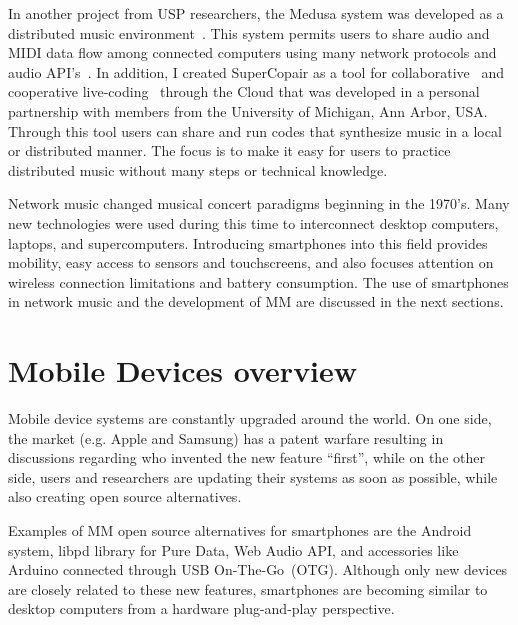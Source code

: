 In another project from USP researchers, the Medusa system was developed as a distributed music environment~\citep{Schiavoni2011medusa,Schiavoni2012network,Schiavoni2013network}.
This system permits users to share audio and MIDI data flow among connected computers using many network protocols and audio API's~\citep{Schiavoni2013thesis}.
In addition, I created SuperCopair as a tool for collaborative~\citep{deCarvalhoJunior2015supercopair} and cooperative live-coding~\citep{deCarvalhoJunior2015cooperative} through the Cloud that was developed in a personal partnership with members from the University of Michigan, Ann Arbor, USA.
Through this tool users can share and run codes that synthesize music in a local or distributed manner.
The focus is to make it easy for users to practice distributed music without many steps or technical knowledge.

Network music changed musical concert paradigms beginning in the 1970's.
Many new technologies were used during this time to interconnect desktop computers, laptops, and supercomputers.
Introducing smartphones into this field provides mobility, easy access to sensors and touchscreens, and also focuses attention on wireless connection limitations and battery consumption.
The use of smartphones in network music and the development of MM are discussed in the next sections.

\section{Mobile Devices overview}
\label{sec:mobiletechnologies}

Mobile device systems are constantly upgraded around the world.
On one side, the market (e.g. Apple and Samsung) has a patent warfare resulting in discussions regarding who invented the new feature ``first'', while on the other side, users and researchers are updating their systems as soon as possible, while also creating open source alternatives.

Examples of MM open source alternatives for smartphones are the Android system, libpd library for Pure Data, Web Audio API, and accessories like Arduino connected through USB On-The-Go~(OTG).
Although only new devices are closely related to these new features, smartphones are becoming similar to desktop computers from a hardware plug-and-play perspective.

